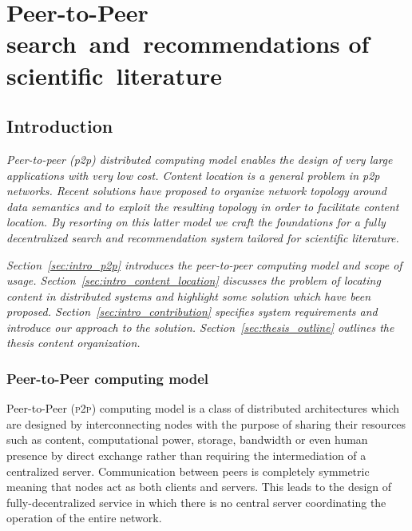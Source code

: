 \part*{Peer-to-Peer search~and~recommendations of scientific~literature}

\setcounter{chapter}{0}
\renewcommand{\thechapter}{\arabic{chapter}}
\def\chaptername{Chapter}

\chapter{\label{chap:intro}Introduction}

\textit{
Peer-to-peer (p2p) distributed computing model enables the design of very large applications with very low cost. Content location is a general problem in p2p networks. Recent solutions have proposed to organize network topology around data semantics and to exploit the resulting topology in order to facilitate content location. By resorting on this latter model we craft the foundations for a fully decentralized search and recommendation system tailored for scientific literature.}

\textit{Section~\ref{sec:intro_p2p} introduces the peer-to-peer computing model and scope of usage. Section~\ref{sec:intro_content_location} discusses the problem of locating content in distributed systems and highlight some solution which have been proposed. Section~\ref{sec:intro_contribution} specifies system requirements and introduce our approach to the solution. Section~\ref{sec:thesis_outline} outlines the thesis content organization.
}

\section{\label{sec:intro_p2p}Peer-to-Peer computing model}
Peer-to-Peer (\textsc{p2p}) computing model is a class of distributed architectures which are designed by interconnecting nodes with the purpose of sharing their resources such as content, computational power, storage, bandwidth or even human presence by direct exchange rather than requiring the intermediation of a centralized server. Communication between peers is completely symmetric meaning that nodes act as both clients and servers. This leads to the design of fully-decentralized service in which there is no central server coordinating the operation of the entire network.

